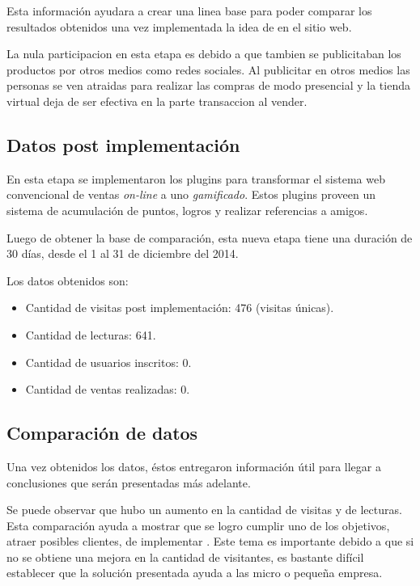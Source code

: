 Esta información ayudara a crear una linea base para poder comparar los
resultados obtenidos una vez implementada la idea de {\GAM} en el sitio web.

La nula participacion en esta etapa es debido a que tambien se publicitaban
los productos por otros medios como redes sociales. Al publicitar en otros medios 
las personas se ven atraidas para realizar las compras de modo presencial y la 
tienda virtual deja de ser efectiva en la parte transaccion al vender.

\subsection{Datos post implementación {\GAM}}

En esta etapa se implementaron los plugins para transformar el sistema web
convencional de ventas \emph{on-line} a uno \emph{gamificado}.
Estos plugins proveen un sistema de acumulación de puntos,
logros y realizar referencias a amigos.

Luego de obtener la base de comparación, esta nueva etapa tiene una duración
de 30 días, desde el 1 al 31 de diciembre del 2014.

Los datos obtenidos son:

\begin{itemize}
    \item Cantidad de visitas post implementación: 476 (visitas únicas).
    \item Cantidad de lecturas: 641.
    \item Cantidad de usuarios inscritos: 0.
    \item Cantidad de ventas realizadas: 0.
\end{itemize}

\subsection{Comparación de datos}

Una vez obtenidos los datos, éstos entregaron información útil para llegar a
conclusiones que serán presentadas más adelante.

Se puede observar que hubo un aumento en la cantidad de visitas y de lecturas.
Esta comparación ayuda a mostrar que se logro cumplir uno de los objetivos,
atraer posibles clientes, de implementar {\GAM}.
Este tema es importante debido a que si no se obtiene una mejora en la cantidad
de visitantes, es bastante difícil establecer que la solución presentada ayuda
a las micro o pequeña empresa.

